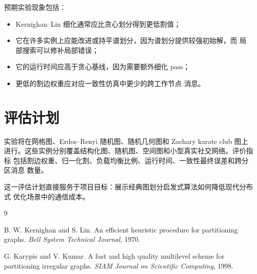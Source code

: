 \documentclass[UTF8, 11pt]{ctexart}
\begin{document}
预期实验现象包括：
\begin{itemize}
    \item Kernighan--Lin 细化通常应比贪心划分得到更低割值；
    \item 它在许多实例上应能改进或持平谱划分，因为谱划分提供较强初始解，而
    局部搜索可以修补局部错误；
    \item 它的运行时间应高于贪心基线，因为需要额外细化 pass；
    \item 更低的割边权重应对应一致性仿真中更少的跨工作节点 消息。
\end{itemize}

\section{评估计划}

实验将在网格图、Erdos--Renyi 随机图、随机几何图和 Zachary karate club 图上
进行。这些实例分别覆盖结构化图、随机图、空间图和小型真实社交网络。评价指标
包括割边权重、归一化割、负载均衡比例、运行时间、一致性最终误差和跨分区消息
数量。

这一评估计划直接服务于项目目标：展示经典图划分启发式算法如何降低现代分布式
优化场景中的通信成本。

\begin{thebibliography}{9}

B. W. Kernighan and S. Lin.
\newblock An efficient heuristic procedure for partitioning graphs.
\newblock \emph{Bell System Technical Journal}, 1970.

G. Karypis and V. Kumar.
\newblock A fast and high quality multilevel scheme for partitioning irregular graphs.
\newblock \emph{SIAM Journal on Scientific Computing}, 1998.

\end{thebibliography}
\end{document}
